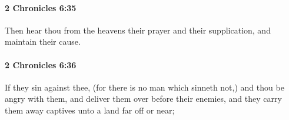 		\paragraph{2 Chronicles 6:35} %
			\label{2CHRONICLES-6-35}

			Then hear thou from the heavens their prayer and their supplication, and maintain their cause.


		\paragraph{2 Chronicles 6:36} %
			\label{2CHRONICLES-6-36}

			If they sin against thee, (for there is no man which sinneth not,) and thou be angry with them, and deliver them over before their enemies, and they carry them away captives unto a land far off or near;



